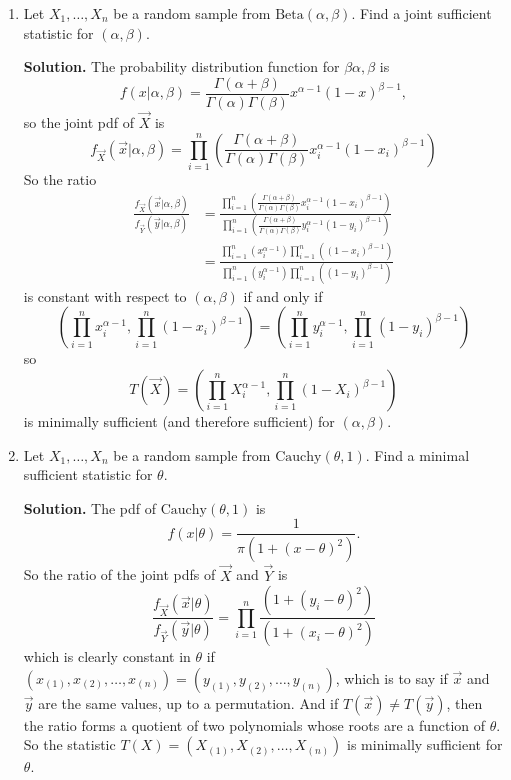 \documentclass[titlepage]{article}
\begin{document}
\begin{enumerate}
\item Let $X_1, \ldots, X_n$ be a random sample from $\text{Beta}(\alpha, \beta)$. Find a joint sufficient statistic for $(\alpha, \beta)$.

\textbf{Solution.} The probability distribution function for $\beta{\alpha, \beta}$ is
\[f(x | \alpha, \beta)=\frac{\Gamma(\alpha + \beta)}{\Gamma(\alpha)\Gamma(\beta)}x^{\alpha - 1}(1-x)^{\beta-1},\]
so the joint pdf of $\vec{X}$ is
\[f_\vec{X}(\vec{x} | \alpha, \beta) = \prod_{i=1}^n\left(\frac{\Gamma(\alpha + \beta)}{\Gamma(\alpha)\Gamma(\beta)}x_i^{\alpha - 1}(1-x_i)^{\beta-1}\right)\]
So the ratio
\[\begin{aligned}
\frac{f_\vec{X}(\vec{x} | \alpha, \beta)}{f_\vec{Y}(\vec{y} | \alpha, \beta)} &= \frac{\prod_{i=1}^n\left(\frac{\Gamma(\alpha + \beta)}{\Gamma(\alpha)\Gamma(\beta)}x_i^{\alpha - 1}(1-x_i)^{\beta-1}\right)}{\prod_{i=1}^n\left(\frac{\Gamma(\alpha + \beta)}{\Gamma(\alpha)\Gamma(\beta)}y_i^{\alpha - 1}(1-y_i)^{\beta-1}\right)} \\
&= \frac{\prod_{i=1}^n\left(x_i^{\alpha - 1}\right) \prod_{i=1}^n\left((1-x_i)^{\beta-1}\right)}{\prod_{i=1}^n\left(y_i^{\alpha - 1}\right)\prod_{i=1}^n\left((1-y_i)^{\beta-1}\right)}
\end{aligned}\]
is constant with respect to $(\alpha, \beta)$ if and only if
\[\left(\prod_{i=1}^n x_i^{\alpha - 1},\prod_{i=1}^n(1 - x_i)^{\beta - 1}\right) = \left(\prod_{i=1}^n y_i^{\alpha - 1},\prod_{i=1}^n(1 - y_i)^{\beta - 1}\right) \]
so
\[T(\vec{X}) = \left(\prod_{i=1}^n X_i^{\alpha - 1},\prod_{i=1}^n(1 - X_i)^{\beta - 1}\right)\]
is minimally sufficient (and therefore sufficient) for $(\alpha, \beta)$.
\item Let $X_1, \ldots, X_n$ be a random sample from $\text{Cauchy}(\theta, 1)$. Find a minimal sufficient statistic for $\theta$.

\textbf{Solution.} The pdf of $\text{Cauchy}(\theta, 1)$ is
\[f(x | \theta) = \frac{1}{\pi(1 + (x - \theta)^2)}.\]
So the ratio of the joint pdfs of $\vec{X}$ and $\vec{Y}$ is
\[
\frac{f_\vec{X}(\vec{x} | \theta)}{f_\vec{Y}(\vec{y}|\theta)} = \prod_{i=1}^n \frac{(1 + (y_i - \theta)^2)}{(1 + (x_i - \theta)^2)}
\]
which is clearly constant in $\theta$ if $(x_{(1)}, x_{(2)}, \ldots, x_{(n)}) = (y_{(1)}, y_{(2)}, \ldots, y_{(n)})$, which is to say if $\vec{x}$ and $\vec{y}$ are the same values, up to a permutation. And if $T(\vec{x}) \neq T(\vec{y})$, then the ratio forms a quotient of two polynomials whose roots are a function of $\theta$. So the statistic $T(X) = (X_{(1)}, X_{(2)}, \ldots, X_{(n)})$ is minimally sufficient for $\theta$.


\end{enumerate}
\end{document}
